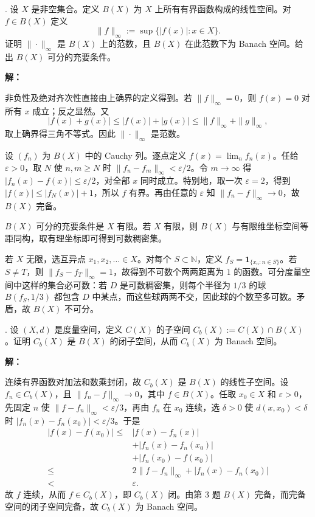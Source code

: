 \documentclass{article}
\begin{document}
\par\medskip{}. 设 $X$ 是非空集合。定义 $B(X)$ 为 $X$ 上所有有界函数构成的线性空间。对 $f\in B(X)$ 定义
\[
\|f\|_\infty:=\sup\{|f(x)|:x\in X\}.
\]
证明 $\|\cdot\|_\infty$ 是 $B(X)$ 上的范数，且 $B(X)$ 在此范数下为 Banach 空间。给出 $B(X)$ 可分的充要条件。


\par{}\noindent\textbf{解：}\par\nopagebreak[4]



非负性及绝对齐次性直接由上确界的定义得到。若 $\|f\|_\infty=0$，则 $f(x)=0$ 对所有 $x$ 成立；反之显然。又
\[
|f(x)+g(x)|\le|f(x)|+|g(x)|\le\|f\|_\infty+\|g\|_\infty,
\]
取上确界得三角不等式。因此 $\|\cdot\|_\infty$ 是范数。

设 $(f_n)$ 为 $B(X)$ 中的 Cauchy 列。逐点定义 $f(x)=\lim_n f_n(x)$。任给 $\varepsilon>0$，取 $N$ 使 $n,m\ge N$ 时 $\|f_n-f_m\|_\infty<\varepsilon/2$。令 $m\to\infty$ 得 $|f_n(x)-f(x)|\le\varepsilon/2$，对全部 $x$ 同时成立。特别地，取一次 $\varepsilon=2$，得到 $|f(x)|\le|f_N(x)|+1$，所以 $f$ 有界。再由任意的 $\varepsilon$ 知 $\|f_n-f\|_\infty\to0$，故 $B(X)$ 完备。

$B(X)$ 可分的充要条件是 $X$ 有限。若 $X$ 有限，则 $B(X)$ 与有限维坐标空间等距同构，取有理坐标即可得到可数稠密集。

若 $X$ 无限，选互异点 $x_1,x_2,\ldots\in X$。对每个 $S\subset\mathbb N$，定义 $f_S=\mathbf1_{\{x_n:n\in S\}}$。若 $S\ne T$，则 $\|f_S-f_T\|_\infty=1$，故得到不可数个两两距离为 $1$ 的函数。可分度量空间中这样的集合必可数：若 $D$ 是可数稠密集，则每个半径为 $1/3$ 的球 $B(f_S,1/3)$ 都包含 $D$ 中某点，而这些球两两不交，因此球的个数至多可数。矛盾，故 $B(X)$ 不可分。


\par\medskip{}. 设 $(X,d)$ 是度量空间，定义 $C(X)$ 的子空间 $C_b(X):=C(X)\cap B(X)$。证明 $C_b(X)$ 是 $B(X)$ 的闭子空间，从而 $C_b(X)$ 为 Banach 空间。


\par{}\noindent\textbf{解：}\par\nopagebreak[4]



连续有界函数对加法和数乘封闭，故 $C_b(X)$ 是 $B(X)$ 的线性子空间。设 $f_n\in C_b(X)$，且 $\|f_n-f\|_\infty\to0$，其中 $f\in B(X)$。任取 $x_0\in X$ 和 $\varepsilon>0$，先固定 $n$ 使 $\|f-f_n\|_\infty<\varepsilon/3$，再由 $f_n$ 在 $x_0$ 连续，选 $\delta>0$ 使 $d(x,x_0)<\delta$ 时 $|f_n(x)-f_n(x_0)|<\varepsilon/3$。于是
\[
\begin{aligned}
|f(x)-f(x_0)|
\le{}&|f(x)-f_n(x)|\\
&+|f_n(x)-f_n(x_0)|\\
&+|f_n(x_0)-f(x_0)|\\
\le{}&2\|f-f_n\|_\infty+|f_n(x)-f_n(x_0)|\\
<{}&\varepsilon.
\end{aligned}
\]
故 $f$ 连续，从而 $f\in C_b(X)$，即 $C_b(X)$ 闭。由第 3 题 $B(X)$ 完备，而完备空间的闭子空间完备，故 $C_b(X)$ 为 Banach 空间。
\end{document}
